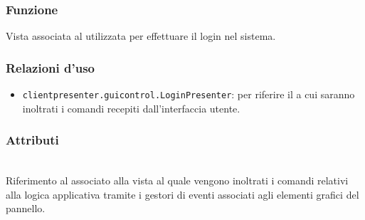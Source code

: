 \subsubsection*{Funzione}
Vista associata al   utilizzata per effettuare il login nel sistema.

\subsubsection*{Relazioni d'uso}
\begin{itemize}
  \item \texttt{clientpresenter.guicontrol.LoginPresenter}: per riferire il  a cui saranno inoltrati i comandi recepiti dall'interfaccia utente.
\end{itemize}

\subsubsection*{Attributi}
\begin{description}
  \item{}\\
  Riferimento al  associato alla vista al quale vengono inoltrati i comandi relativi alla logica applicativa tramite i gestori di eventi associati agli elementi grafici del pannello.
\end{description}


